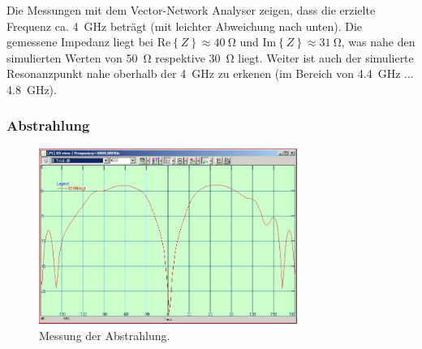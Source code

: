 %

Die Messungen mit dem Vector-Network Analyser zeigen, dass die erzielte
Frequenz ca. \SI{4}{\giga\hertz} beträgt (mit leichter Abweichung nach
unten). Die gemessene Impedanz liegt bei
$\mathrm{Re}\left\{Z\right\} \approx \SI{40}{\ohm}$ und
$\mathrm{Im}\left\{Z\right\} \approx \SI{31}{\ohm}$, was nahe den
simulierten Werten von \SI{50}{\ohm} respektive \SI{30}{\ohm} liegt.
Weiter ist auch der simulierte Resonanzpunkt nahe oberhalb der
\SI{4}{\giga\hertz} zu erkenen (im Bereich von \SI{4.4}{\giga\hertz}
$\dots$ \SI{4.8}{\giga\hertz}).


\clearpage
\subsubsection{Abstrahlung}

\begin{figure}[h!]
	\centering
	\includegraphics[width=0.75\textwidth]{../data/measurement/measurement_star_90deg_cut.JPG}
	\caption{Messung der Abstrahlung.}
\end{figure}

